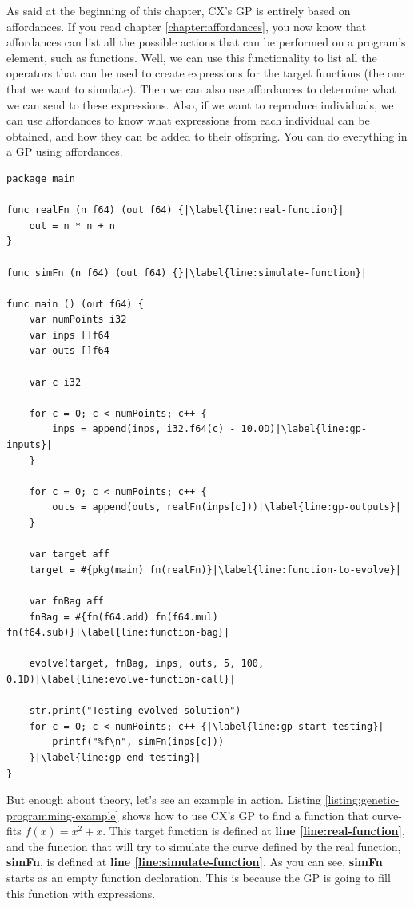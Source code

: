 \documentclass[11pt,fleqn,openany]{book} %
\begin{document}
As said at the beginning of this chapter, CX's GP is entirely based on affordances. If you read chapter \ref{chapter:affordances}, you now know that affordances can list all the possible actions that can be performed on a program's element, such as functions. Well, we can use this functionality to list all the operators that can be used to create expressions for the target functions (the one that we want to simulate). Then we can also use affordances to determine what we can send to these expressions. Also, if we want to reproduce individuals, we can use affordances to know what expressions from each individual can be obtained, and how they can be added to their offspring. You can do everything in a GP using affordances.

\begin{lstlisting}[caption={Using genetic programming to evolve a function},captionpos=b,label={listing:genetic-programming-example}]
package main

func realFn (n f64) (out f64) {|\label{line:real-function}|
    out = n * n + n
}

func simFn (n f64) (out f64) {}|\label{line:simulate-function}|

func main () (out f64) {
	var numPoints i32
    var inps []f64
    var outs []f64
    
    var c i32
    
	for c = 0; c < numPoints; c++ {
        inps = append(inps, i32.f64(c) - 10.0D)|\label{line:gp-inputs}|
	}

	for c = 0; c < numPoints; c++ {
        outs = append(outs, realFn(inps[c]))|\label{line:gp-outputs}|
	}
	
    var target aff
    target = #{pkg(main) fn(realFn)}|\label{line:function-to-evolve}|
    
    var fnBag aff
    fnBag = #{fn(f64.add) fn(f64.mul) fn(f64.sub)}|\label{line:function-bag}|
    
	evolve(target, fnBag, inps, outs, 5, 100, 0.1D)|\label{line:evolve-function-call}|

	str.print("Testing evolved solution")
	for c = 0; c < numPoints; c++ {|\label{line:gp-start-testing}|
        printf("%f\n", simFn(inps[c]))
	}|\label{line:gp-end-testing}|
}
\end{lstlisting}

But enough about theory, let's see an example in action. Listing \ref{listing:genetic-programming-example} shows how to use CX's GP to find a function that curve-fits $f(x) = x^2 + x$. This target function is defined at \textbf{line \ref{line:real-function}}, and the function that will try to simulate the curve defined by the real function, \textbf{simFn}, is defined at \textbf{line \ref{line:simulate-function}}. As you can see, \textbf{simFn} starts as an empty function declaration. This is because the GP is going to fill this function with expressions.
\end{document}
